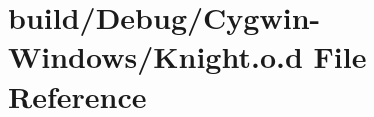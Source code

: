 \hypertarget{_cygwin-_windows_2_knight_8o_8d}{}\section{build/\+Debug/\+Cygwin-\/\+Windows/\+Knight.o.\+d File Reference}
\label{_cygwin-_windows_2_knight_8o_8d}
